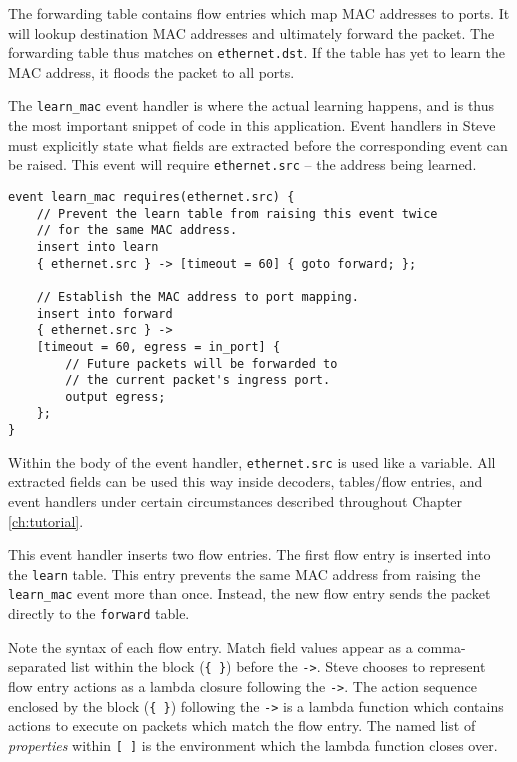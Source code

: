 The forwarding table contains flow entries which map MAC addresses to ports. It will lookup destination MAC addresses and ultimately forward the packet. The forwarding table thus
matches on \texttt{ethernet.dst}. If the table has yet to learn the MAC address, it floods the packet to all ports.

The \texttt{learn\_mac} event handler is where the actual
learning happens, and is thus the most important snippet of code in this
application. Event handlers in Steve must explicitly state what fields are extracted before the corresponding event can be raised. This event will require \texttt{ethernet.src} -- the address being learned.

\begin{codepage}
\begin{lstlisting}
event learn_mac requires(ethernet.src) {
	// Prevent the learn table from raising this event twice
	// for the same MAC address.
	insert into learn
	{ ethernet.src } -> [timeout = 60] { goto forward; };

	// Establish the MAC address to port mapping.
	insert into forward
	{ ethernet.src } ->
	[timeout = 60, egress = in_port] {
		// Future packets will be forwarded to
		// the current packet's ingress port.
		output egress;
	};
}
\end{lstlisting}
\end{codepage}

Within the body of the event handler, \texttt{ethernet.src} is used like a variable. All extracted fields can be used this way inside decoders, tables/flow entries, and event handlers under certain circumstances described throughout Chapter \ref{ch:tutorial}.

This event handler inserts two flow entries.
The first flow entry is inserted into
the \texttt{learn} table. 
This entry prevents the same MAC address from raising the
\texttt{learn\_mac} event more than once.
Instead, the new flow entry sends the packet directly to the \texttt{forward} 
table.

Note the syntax of each flow entry. Match field values appear as a comma-separated list within the block (\texttt{\{ \}}) before the \texttt{->}. Steve chooses to represent flow entry actions as a lambda closure following the \texttt{->}. The action sequence enclosed by the block (\texttt{\{ \}}) following the \texttt{->} is a lambda function which contains actions to execute on packets which match the flow entry. The named list of \emph{properties} within \texttt{[ ]} is the environment which the lambda function closes over.


